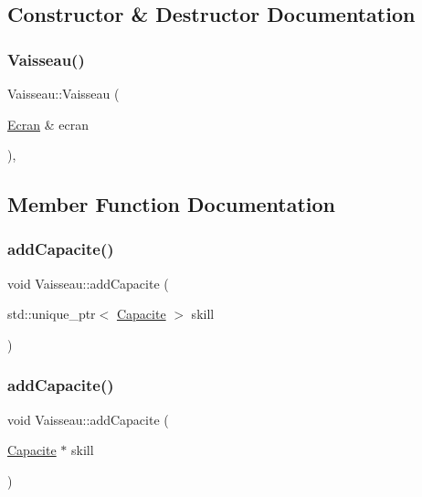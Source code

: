 \subsection{Constructor \& Destructor Documentation}
\mbox{\label{class_vaisseau_a91bee41b6575b4ee41128d7f6ad3ef88}} 
\subsubsection{\texorpdfstring{Vaisseau()}{Vaisseau()}}
{\footnotesize\ttfamily Vaisseau\+::\+Vaisseau (\begin{DoxyParamCaption}\item[{\mbox{\hyperlink{class_ecran}{Ecran}} \&}]{ecran }\end{DoxyParamCaption})\hspace{0.3cm}{\ttfamily [inline]}, {\ttfamily [explicit]}}



\subsection{Member Function Documentation}
\mbox{\label{class_vaisseau_a49a366c2b72649ad942fd8aa896997bb}} 
\subsubsection{\texorpdfstring{add\+Capacite()}{addCapacite()}\hspace{0.1cm}{\footnotesize\ttfamily [1/2]}}
{\footnotesize\ttfamily void Vaisseau\+::add\+Capacite (\begin{DoxyParamCaption}\item[{std\+::unique\+\_\+ptr$<$ \mbox{\hyperlink{class_capacite}{Capacite}} $>$}]{skill }\end{DoxyParamCaption})\hspace{0.3cm}{\ttfamily [inline]}}

\mbox{\label{class_vaisseau_a04d7069231187e7dba26a06a0aaf2508}} 
\subsubsection{\texorpdfstring{add\+Capacite()}{addCapacite()}\hspace{0.1cm}{\footnotesize\ttfamily [2/2]}}
{\footnotesize\ttfamily void Vaisseau\+::add\+Capacite (\begin{DoxyParamCaption}\item[{\mbox{\hyperlink{class_capacite}{Capacite}} $\ast$}]{skill }\end{DoxyParamCaption})\hspace{0.3cm}{\ttfamily [inline]}}

